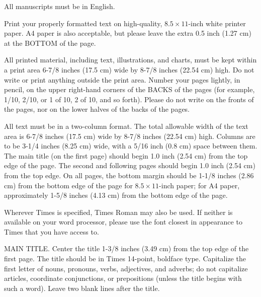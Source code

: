 \documentclass[times, 10pt,twocolumn]{article}
\begin{document}
All manuscripts must be in English.


Print your properly formatted text on high-quality, $8.5 \times 11$-inch 
white printer paper. A4 paper is also acceptable, but please leave the 
extra 0.5 inch (1.27 cm) at the BOTTOM of the page.


All printed material, including text, illustrations, and charts, must be 
kept within a print area 6-7/8 inches (17.5 cm) wide by 8-7/8 inches 
(22.54 cm) high. Do not write or print anything outside the print area. 
Number your pages lightly, in pencil, on the upper right-hand corners of 
the BACKS of the pages (for example, 1/10, 2/10, or 1 of 10, 2 of 10, and 
so forth). Please do not write on the fronts of the pages, nor on the 
lower halves of the backs of the pages.



All text must be in a two-column format. The total allowable width of 
the text area is 6-7/8 inches (17.5 cm) wide by 8-7/8 inches (22.54 cm) 
high. Columns are to be 3-1/4 inches (8.25 cm) wide, with a 5/16 inch 
(0.8 cm) space between them. The main title (on the first page) should 
begin 1.0 inch (2.54 cm) from the top edge of the page. The second and 
following pages should begin 1.0 inch (2.54 cm) from the top edge. On 
all pages, the bottom margin should be 1-1/8 inches (2.86 cm) from the 
bottom edge of the page for $8.5 \times 11$-inch paper; for A4 paper, 
approximately 1-5/8 inches (4.13 cm) from the bottom edge of the page.


Wherever Times is specified, Times Roman may also be used. If neither is 
available on your word processor, please use the font closest in 
appearance to Times that you have access to.

MAIN TITLE. Center the title 1-3/8 inches (3.49 cm) from the top edge of 
the first page. The title should be in Times 14-point, boldface type. 
Capitalize the first letter of nouns, pronouns, verbs, adjectives, and 
adverbs; do not capitalize articles, coordinate conjunctions, or 
prepositions (unless the title begins with such a word). Leave two blank 
lines after the title.
\end{document}
